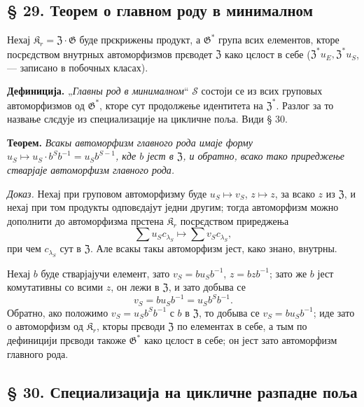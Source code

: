 \documentclass[11pt]{article}
\begin{document}
\subsection*{§ 29. Теорем о главном роду в минималном}\label{hauptgeschlechtssatz-im-minimalen}

Нехај \(\mathfrak K_r=\mathfrak Z\cdot\mathfrak G\) буде прєкрижены продукт, а \(\mathfrak G^*\) група всих елементов, кторе посрєдством внутрных автоморфизмов прєводет \(\mathfrak Z\) како цєлост в себе (\(\mathfrak Z^*u_E,\mathfrak Z^*u_S\), --- записано в побочных класах).

\noindent\textbf{Дефиниција.} „\emph{Главны род в минималном}“ \(\mathscr S\) состоји се из всих груповых автоморфизмов од \(\mathfrak G^*\), кторе сут продолжење идентитета на \(\mathfrak Z^*\). Разлог за то назвање слєдује из специализације на цикличне поља. Види § 30.

\noindent\textbf{Теорем.} \emph{Всакы автоморфизм главного рода имаје форму \(u_S\mapsto u_S\cdot b^Sb^{-1}=u_Sb^{S-1}\), кде \(b\) јест в \(\mathfrak Z\), и обратно, всако тако приреджење стварјаје автоморфизм главного рода.}

\noindent\emph{Доказ.} Нехај при груповом автоморфизму буде \(u_S\mapsto v_S\), \(z\mapsto z\), за всако \(z\) из \(\mathfrak Z\), и нехај при том продукты одповєдајут једни другим; тогда автоморфизм можно дополнити до автоморфизма прстена \(\mathfrak K_r\) посрєдством приреджења
\[
\sum u_Sc_{\lambda_S}\mapsto\sum v_Sc_{\lambda_S},
\]
при чем \(c_{\lambda_S}\) сут в \(\mathfrak Z\). Але всакы такы автоморфизм јест, како знано, внутрны.

Нехај \(b\) буде стварјајучи елемент, зато \(v_S=bu_Sb^{-1}\), \(z=bzb^{-1}\); зато же \(b\) јест комутативны со всими \(z\), он лежи в \(\mathfrak Z\), и зато добыва се
\[
v_S=bu_Sb^{-1}=u_Sb^Sb^{-1}.
\]
Обратно, ако положимо \(v_S=u_Sb^Sb^{-1}\) с \(b\) в \(\mathfrak Z\), то добыва се \(v_S=bu_Sb^{-1}\); иде зато о автоморфизм од \(\mathfrak K_r\), кторы прєводи \(\mathfrak Z\) по елементах в себе, а тым по дефиницији прєводи такоже \(\mathfrak G^*\) како цєлост в себе; он јест зато автоморфизм главного рода.

\subsection*{§ 30. Специализација на цикличне разпадне поља}\label{spezialisierung-auf-zyklische-zerfaellungskoerper}
\end{document}
